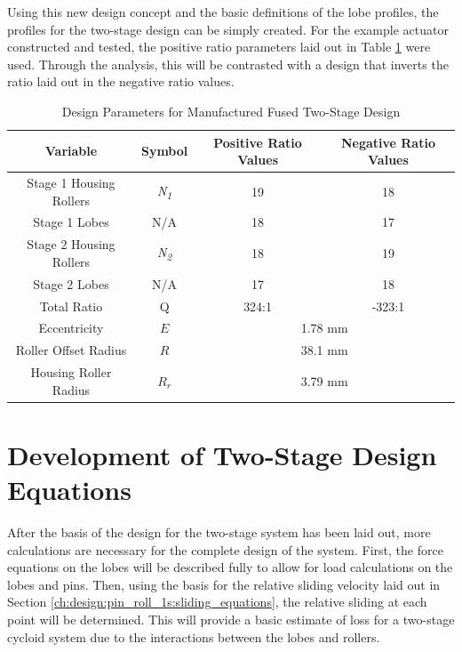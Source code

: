 Using this new design concept and the basic definitions of the lobe profiles, the profiles for the two-stage design can be simply created. For the example actuator constructed and tested, the positive ratio parameters laid out in Table \ref{table:two_stage_design_params} were used. Through the analysis, this will be contrasted with a design that inverts the ratio laid out in the negative ratio values.
\begin{table}[t]
  \vskip0.2cm
  \caption{Design Parameters for Manufactured Fused Two-Stage Design}
  \label{table:two_stage_design_params}
  \begin{center}
    \vskip-0.2cm
	\begin{tabular}{|c|c|c|c|}
		\hline
		Variable & Symbol & Positive Ratio Values & Negative Ratio Values\\
		\hline
		Stage 1 Housing Rollers & \textit{N\textsubscript{1}} & 19 & 18\\
		\hline
		Stage 1 Lobes & N/A & 18 & 17\\
		\hline
		Stage 2 Housing Rollers & \textit{N\textsubscript{2}} & 18 & 19\\
		\hline
		Stage 2 Lobes & N/A & 17 & 18\\
		\hline
		Total Ratio & Q & 324:1  & -323:1 \\
		\hline
		Eccentricity & $E$ & \multicolumn{2}{c|}{1.78 mm} \\
		\hline
		Roller Offset Radius & $R$& \multicolumn{2}{c|}{38.1 mm} \\
		\hline
		Housing Roller Radius & $R_r$ & \multicolumn{2}{c|}{3.79 mm} \\
		\hline
	\end{tabular}
  \end{center}
\end{table}

\section{Development of Two-Stage Design Equations} \label{ch:dual:equations}

After the basis of the design for the two-stage system has been laid out, more calculations are necessary for the complete design of the system. First, the force equations on the lobes will be described fully to allow for load calculations on the lobes and pins. Then, using the basis for the relative sliding velocity laid out in Section \ref{ch:design:pin_roll_1s:sliding_equations}, the relative sliding at each point will be determined. This will provide a basic estimate of loss for a two-stage cycloid system due to the interactions between the lobes and rollers. 

